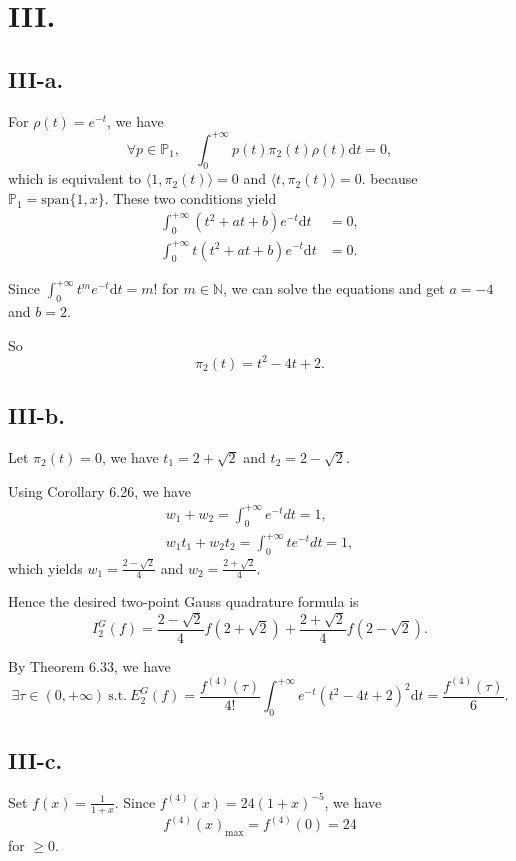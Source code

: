 \documentclass[a4paper]{article}
\begin{document}
\section*{III.}
\subsection*{III-a.}
For $\rho(t)=e^{-t}$, we have
$$
\forall p\in\mathbb{P}_1,\quad\int_0^{+\infty}p(t)\pi_2(t)\rho(t)\mathrm{d}t=0,
$$
which is equivalent to $\langle 1,\pi_2(t)\rangle=0 $ and $\langle t,\pi_2(t)\rangle=0.$ because $\mathbb{P}_1=\text{span}\{1,x\}$.
These two conditions yield
$$
\begin{aligned}
  \int_0^{+\infty}(t^2+at+b)e^{-t}\mathrm{d}t&=0,\\
  \int_0^{+\infty}t(t^2+at+b)e^{-t}\mathrm{d}t&=0.
\end{aligned}
$$

Since $\int_0^{+\infty}t^me^{-t}\mathrm{d}t=m!$ for $m\in\mathbb{N}$, we can solve the equations and get $a=-4$ and $b=2$.

So
$$
\pi_2(t)=t^2-4t+2.
$$

\subsection*{III-b.}
Let $\pi_2(t)=0$, we have $t_{1}=2+\sqrt{2}$ and $t_{2}=2-\sqrt{2}.$

Using Corollary 6.26, we have
$$
\begin{aligned}
  w_{1}+w_{2}=\int_{0}^{+\infty}e^{-t}dt=1,\\
  w_{1}t_{1}+w_{2}t_{2}=\int_{0}^{+\infty}te^{-t}dt=1,
\end{aligned}
$$
which yields $w_{1}=\frac{2-\sqrt{2}}{4}$ and $w_{2}=\frac{2+\sqrt{2}}{4}.$

Hence the desired two-point Gauss quadrature formula is
$$
I^G_2(f)=\frac{2-\sqrt{2}}{4}f(2+\sqrt{2})+\frac{2+\sqrt{2}}{4}f(2-\sqrt{2}).
$$

By Theorem 6.33, we have
$$
\exists \tau \in(0,+\infty)\ \text{s.t.}\ E^G_2(f)=\frac{f^{(4)}(\tau)}{4!}\int_{0}^{+\infty}e^{-t}(t^2-4t+2)^2\mathrm{d}t=\frac{f^{(4)}(\tau)}{6}.
$$

\subsection*{III-c.}
Set $f(x)=\frac{1}{1+x}$. Since $f^{(4)}(x)=24(1+x)^{-5}$, we have
$$
f^{(4)}(x)_{\max}=f^{(4)}(0)=24
$$
for $\geq0$.
\end{document}
